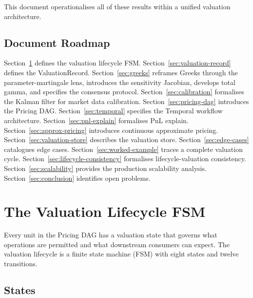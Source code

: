 \documentclass[11pt,a4paper]{article}
\begin{document}
This document operationalises all of these results within a unified valuation architecture.

\subsection{Document Roadmap}

Section~\ref{sec:fsm} defines the valuation lifecycle FSM.  Section~\ref{sec:valuation-record} defines the ValuationRecord.  Section~\ref{sec:greeks} reframes Greeks through the parameter-martingale lens, introduces the sensitivity Jacobian, develops total gamma, and specifies the consensus protocol.  Section~\ref{sec:calibration} formalises the Kalman filter for market data calibration.  Section~\ref{sec:pricing-dag} introduces the Pricing DAG.  Section~\ref{sec:temporal} specifies the Temporal workflow architecture.  Section~\ref{sec:pnl-explain} formalises PnL explain.  Section~\ref{sec:approx-pricing} introduces continuous approximate pricing.  Section~\ref{sec:valuation-store} describes the valuation store.  Section~\ref{sec:edge-cases} catalogues edge cases.  Section~\ref{sec:worked-example} traces a complete valuation cycle.  Section~\ref{sec:lifecycle-consistency} formalises lifecycle-valuation consistency.  Section~\ref{sec:scalability} provides the production scalability analysis.  Section~\ref{sec:conclusion} identifies open problems.

\clearpage
\section{The Valuation Lifecycle FSM}
\label{sec:fsm}

Every unit in the Pricing DAG has a valuation state that governs what operations are permitted and what downstream consumers can expect.  The valuation lifecycle is a finite state machine (FSM) with eight states and twelve transitions.

\subsection{States}
\end{document}

